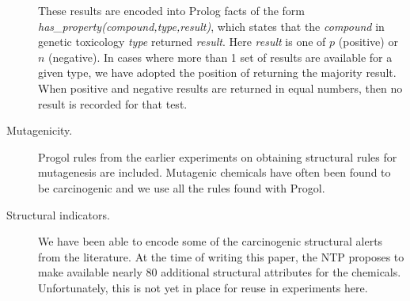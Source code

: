 \begin{description}
        These results are encoded into Prolog facts of the form
        {\em has\_property(compound,type,result)\/}, which states
        that the {\em compound\/} in genetic toxicology {\em type\/}
        returned {\em result\/}. Here {\em result\/} is one of $p$
        (positive) or $n$ (negative).
        In cases where more than 1 set of results are available for
        a given type, we have adopted the position of returning the
        majority result. When positive and negative results are returned
        in equal numbers, then no result is recorded for that test.
\item[Mutagenicity.] Progol rules from the earlier experiments on
        obtaining structural rules for mutagenesis are
        included. Mutagenic chemicals
        have often been found to be carcinogenic
        and we use all the rules found with Progol.
\item[Structural indicators.] We have been able to encode some of
        the carcinogenic structural alerts from the literature. At the
        time of writing this paper, the NTP proposes to make available
        nearly $80$ additional structural attributes for the chemicals.
        Unfortunately, this is not yet in place for reuse in experiments here.
\end{description}




